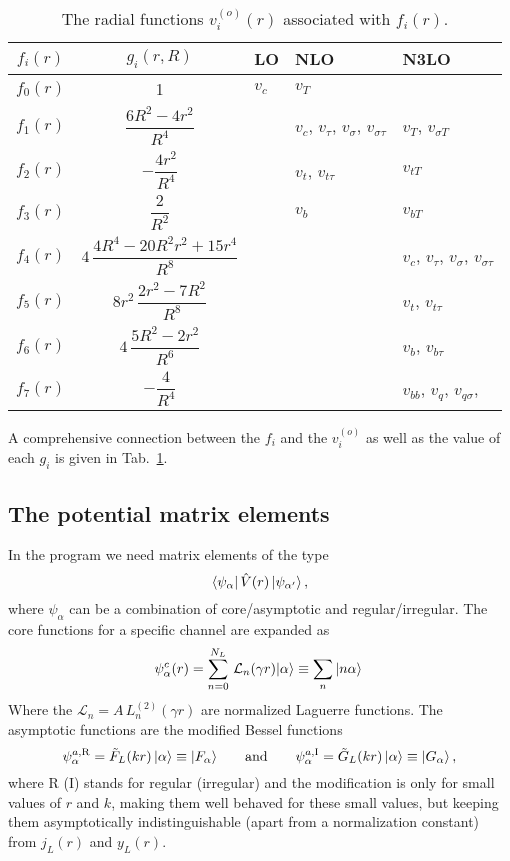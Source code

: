 \documentclass[10pt,a4paper]{article}
\DeclarePairedDelimiter\Bra{\langle}{\rvert}
\DeclarePairedDelimiter\Ket{\lvert}{\rangle}
\newcommand{\bra}[1]{\Bra{#1}}
\newcommand{\ket}[1]{\Ket{#1}}
\newcommand{\matrixelement}[3]{\bra{#1}\,#2\,\ket{#3}}
\newcommand{\mand}{\qquad\mathrm{and}\qquad}
\newcommand{\mtm}[1]{\mathrm{#1}}
\begin{document}
	 \begin{table}[t]
	 	\centering
	 	\renewcommand{\arraystretch}{2.3} 
	 	\begin{tabular}{|c|c|l|l|l|}
	 		\hline
	 		\rowcolor{yellow}
	 		$f_i(r)$ & $g_i(r,R)$ & LO & NLO & N3LO \\\hline
	 		$f_0(r)$ & 1 & $v_c$ & $v_T$ & \\
	 		$f_1(r)$ & $\dfrac{6R^2-4r^2}{R^4}$ &  & $v_c$, $v_\tau$, $v_\sigma$, $v_{\sigma\tau}$ & $v_T$, $v_{\sigma T}$\\
	 		$f_2(r)$ & $-\dfrac{4r^2}{R^4}$ & & $v_t$, $v_{t\tau}$ &  $v_{tT}$\\
	 		$f_3(r)$ & $\dfrac{2}{R^2}$ &  & $v_b$ & $v_{bT}$\\
	 		$f_4(r)$ & $4\,\dfrac{4R^4-20R^2r^2+15r^4}{R^8}$ &  & & $v_c$, $v_\tau$, $v_\sigma$, $v_{\sigma\tau}$\\
	 		$f_5(r)$ & $8r^2\,\dfrac{2r^2-7R^2}{R^8}$ & & & $v_t$, $v_{t\tau}$\\
	 		$f_6(r)$ & $4\,\dfrac{5R^2-2r^2}{R^6}$ & & & $v_b$, $v_{b\tau}$\\
	 		$f_7(r)$ & $-\dfrac{4}{R^4}$ & & & $v_{bb}$, $v_q$, $v_{q\sigma}$,\\
	 		\hline
	 	\end{tabular}
	 	\caption{The radial functions $v_i^{(o)}(r)$ associated with $f_i(r)$.}
	 	\label{tab:functions}
	 \end{table}
	 A comprehensive connection between the $f_i$ and the $v_i^{(o)}$ as well as the value of each $g_i$ is given in Tab.~\ref{tab:functions}.
	 
	 
	 \subsection{The potential matrix elements}
	 In the program we need matrix elements of the type
	 \begin{equation}
	 	\matrixelement{\psi_\alpha}{\hat{V}(r)}{\psi_{\alpha'}}\,,
	 \end{equation}
	 where $\psi_\alpha$ can be a combination of core/asymptotic and regular/irregular. 
	 The core functions for a specific channel are expanded as
	 \begin{equation}
	 	\psi_\alpha^c(r) = \sum_{n=0}^{N_L}\,\mathcal{L}_n(\gamma r)\ket{\alpha}\equiv \sum_n\,\ket{n\alpha}\,
	 \end{equation}
	 Where the $\mathcal{L}_n = A\,L_n^{(2)}(\gamma r)$ are normalized Laguerre functions. 
	 The asymptotic functions are the modified Bessel functions 
	 \begin{equation}
	 	\psi_\alpha^{a, \mtm{R}} = \tilde{F}_L(kr)\,\ket{\alpha} \equiv \ket{F_\alpha}
	 	\mand
	 	\psi_\alpha^{a, \mtm{I}} = \tilde{G}_L(kr)\,\ket{\alpha}\equiv \ket{G_\alpha}\,,
	 \end{equation}
	 where R (I) stands for regular (irregular) and the modification is only for small values of $r$ and $k$, making them well behaved for these small values, but keeping them asymptotically indistinguishable (apart from a normalization constant) from $j_L(r)$ and $y_L(r)$.
	 
\end{document}
